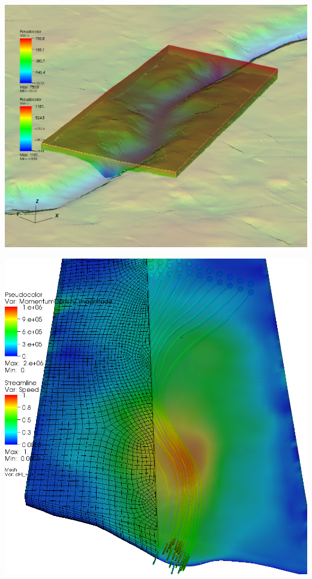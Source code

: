 \begin{frame}
  \centering
  \includegraphics[width=\textwidth]{figures/jakotransparent}
\end{frame}

\begin{frame}
  \includegraphics[width=\textwidth]{figures/VHT/TopViewStreamline}
\end{frame}

